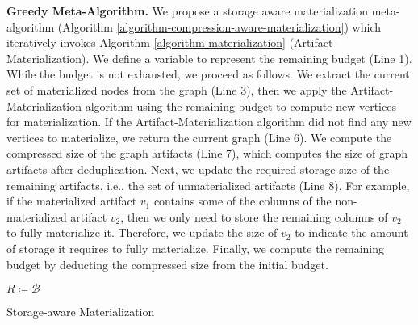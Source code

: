\textbf{Greedy Meta-Algorithm.}
We propose a storage aware materialization meta-algorithm (Algorithm \ref{algorithm-compression-aware-materialization}) which iteratively invokes Algorithm \ref{algorithm-materialization} (Artifact-Materialization).
We define a variable to represent the remaining budget (Line 1).
While the budget is not exhausted, we proceed as follows.
We extract the current set of materialized nodes from the graph (Line 3), then we apply the Artifact-Materialization algorithm using the remaining budget to compute new vertices for materialization.
If the Artifact-Materialization algorithm did not find any new vertices to materialize, we return the current graph (Line 6).
We compute the compressed size of the graph artifacts (Line 7), which computes the size of graph artifacts after deduplication. 
Next, we update the required storage size of the remaining artifacts, i.e., the set of unmaterialized artifacts (Line 8).
For example, if the materialized artifact $v_1$ contains some of the columns of the non-materialized artifact $v_2$, then we only need to store the remaining columns of $v_2$ to fully materialize it.
Therefore, we update the size of $v_2$ to indicate the amount of storage it requires to fully materialize.
Finally, we compute the remaining budget by deducting the compressed size from the initial budget.
\begin{algorithm}[h]
$R \coloneqq  \mathcal{B}$ \;
\caption{Storage-aware Materialization}\label{algorithm-compression-aware-materialization}
\end{algorithm}


